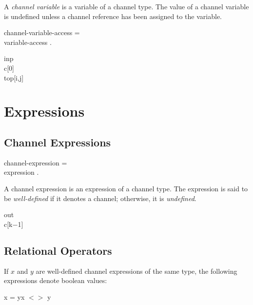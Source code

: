A {\it channel variable} is a variable of a channel type.
The value of a channel variable is undefined unless a
channel reference has been assigned to the variable.

\blankline

\begin{grammar}
  {\GA}channel-variable-access = \\
    {\GB}variable-access .       \\
\end{grammar}

\examples

\begin{program}{2.9em}
  {\PA}inp     \\
  {\PA}c[0]    \\
  {\PA}top[i,j]
\end{program}


\section{Expressions}

\subsection{Channel Expressions}

\begin{grammar}
  {\GA}channel-expression =\\
    {\GB}expression .      \\
\end{grammar}

A channel expression is an expression of a channel type. The
expression is said to be {\it well-defined} if it denotes a
channel; otherwise, it is {\it undefined}.

\blankline

\examples

\begin{program}{2.4em}
  {\PA}out     \\
  {\PA}c[k$-$1]
\end{program}


\subsection{Relational Operators}

If $x$ and $y$ are well-defined channel expressions of the
same type, the following expressions denote boolean values:

\begin{center}
  x = y{\blank}x $<>$ y
\end{center}


